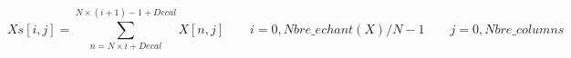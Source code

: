 \[
Xs[i,j] = \sum_{n= N\times i + Decal}^{N\times (i+1) -1 + Decal} X[n,j] 
 \qquad i=0, Nbre\_echant(X)/N -1 
 \qquad j=0, Nbre\_columns
\]
